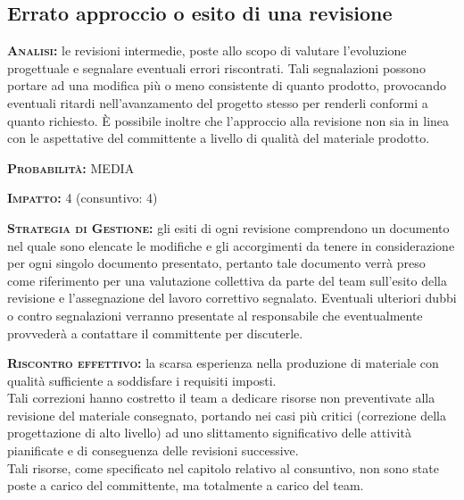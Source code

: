 \subsection{Errato approccio o esito di una revisione}
\begin{description}
	\item{\scshape\bfseries Analisi:} le revisioni intermedie, poste allo scopo di valutare l'evoluzione progettuale e segnalare eventuali errori riscontrati. Tali segnalazioni possono portare ad una modifica più o meno consistente di quanto prodotto, provocando eventuali ritardi nell'avanzamento del progetto stesso per renderli conformi a quanto richiesto.
È possibile inoltre che l'approccio alla revisione non sia in linea con le aspettative del committente a livello di qualità del materiale prodotto.
	\item{\scshape\bfseries Probabilità:} MEDIA
	\item{\scshape\bfseries Impatto:} 4 (consuntivo: 4)
	\item{\scshape\bfseries Strategia di Gestione:} gli esiti di ogni revisione comprendono un documento nel quale sono elencate le modifiche e gli accorgimenti da tenere in considerazione per ogni singolo documento presentato, pertanto tale documento verrà preso come riferimento per una valutazione collettiva da parte del team sull'esito della revisione e l'assegnazione del lavoro correttivo segnalato.
Eventuali ulteriori dubbi o contro segnalazioni verranno presentate al responsabile che eventualmente provvederà a contattare il committente per discuterle.
	\item{\scshape\bfseries Riscontro effettivo:} la scarsa esperienza nella produzione di materiale con qualità sufficiente a soddisfare i requisiti imposti.\\Tali correzioni hanno costretto il team a dedicare risorse non preventivate alla revisione del materiale consegnato, portando nei casi più critici (correzione della progettazione di alto livello) ad uno slittamento significativo delle attività pianificate e di conseguenza delle revisioni successive.\\
Tali risorse, come specificato nel capitolo relativo al consuntivo, non sono state poste a carico del committente, ma totalmente a carico del team.
\end{description}




